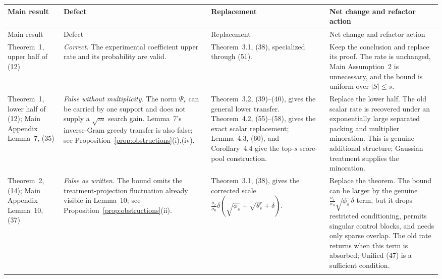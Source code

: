 \documentclass[a4paper,10pt,english]{article}
\theoremstyle{definition}
\begin{document}
\begingroup
\small
\setlength{\tabcolsep}{3.2pt}
\renewcommand{\arraystretch}{1.06}
\begin{longtable}{@{}>{\raggedright\arraybackslash}p{}
>{\raggedright\arraybackslash}p{}
>{\raggedright\arraybackslash}p{}
>{\raggedright\arraybackslash}p{}@{}}
\toprule
Main result & Defect & Replacement &
Net change and refactor action \\
\midrule
\endfirsthead
\toprule
Main result & Defect & Replacement &
Net change and refactor action \\
\midrule
\endhead

Theorem~1, upper half of (12) &
\emph{Correct.}  The experimental coefficient upper rate and its
probability are valid. &
Theorem~3.1, (38), specialized through (51). &
Keep the conclusion and replace its proof.  The rate is unchanged,
Main Assumption~2 is unnecessary, and the bound is uniform over
$|S|\le s$. \\
\addlinespace

Theorem~1, lower half of (12); Main Appendix Lemma~7, (35) &
\emph{False without multiplicity.}  The norm $\Psi_s$ can be carried by
one support and does not supply a $\sqrt m$ search gain.  Lemma~7's
inverse-Gram greedy transfer is also false; see
Proposition~\ref{prop:obstructions}(i),(iv). &
Theorem~3.2, (39)--(40), gives the general lower transfer.
Theorem~4.2, (55)--(58), gives the exact scalar replacement;
Lemma~4.3, (60), and Corollary~4.4 give the top-$s$ score-pool
construction. &
Replace the lower half.  The old scalar rate is recovered under an
exponentially large separated packing and multiplier minoration.  This
is genuine additional structure; Gaussian treatment supplies the
minoration. \\
\addlinespace

Theorem~2, (14); Main Appendix Lemma~10, (37) &
\emph{False as written.}  The bound omits the treatment-projection
fluctuation already visible in Lemma~10; see
Proposition~\ref{prop:obstructions}(ii). &
Theorem~3.1, (38), gives the corrected scale
$\frac{\sigma_r}{\sigma_0}\delta
(\sqrt{\phi_s}+\sqrt{\theta_s^r}+\delta)$. &
Replace the theorem.  The bound can be larger by the genuine
$\frac{\sigma_r}{\sigma_0}\sqrt{\phi_s}\,\delta$ term, but it drops
restricted conditioning, permits singular control blocks, and needs
only sparse overlap.  The old rate returns when this term is absorbed;
Unified (47) is a sufficient condition. \\
\addlinespace


\end{longtable}
\end{document}
